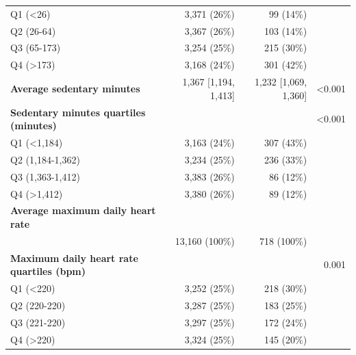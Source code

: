 \documentclass[11pt]{article}
\begin{document}
\begin{longtable}{@{}p{6.4cm}rrr@{}}
\quad Q1 (<26) & 3,371 (26\%) & 99 (14\%) &  \\
\quad Q2 (26-64) & 3,367 (26\%) & 103 (14\%) &  \\
\quad Q3 (65-173) & 3,254 (25\%) & 215 (30\%) &  \\
\quad Q4 (>173) & 3,168 (24\%) & 301 (42\%) &  \\
\textbf{Average sedentary minutes} & 1,367 [1,194, 1,413] & 1,232 [1,069, 1,360] & <0.001 \\
\textbf{Sedentary minutes quartiles (minutes)} &  &  & <0.001 \\
\quad Q1 (<1,184) & 3,163 (24\%) & 307 (43\%) &  \\
\quad Q2 (1,184-1,362) & 3,234 (25\%) & 236 (33\%) &  \\
\quad Q3 (1,363-1,412) & 3,383 (26\%) & 86 (12\%) &  \\
\quad Q4 (>1,412) & 3,380 (26\%) & 89 (12\%) &  \\
\textbf{Average maximum daily heart rate} &  &  &  \\
\quad 220 & 13,160 (100\%) & 718 (100\%) &  \\
\textbf{Maximum daily heart rate quartiles (bpm)} &  &  & 0.001 \\
\quad Q1 (<220) & 3,252 (25\%) & 218 (30\%) &  \\
\quad Q2 (220-220) & 3,287 (25\%) & 183 (25\%) &  \\
\quad Q3 (221-220) & 3,297 (25\%) & 172 (24\%) &  \\
\quad Q4 (>220) & 3,324 (25\%) & 145 (20\%) &  \\
\bottomrule \end{longtable}\normalsize
\end{document}
